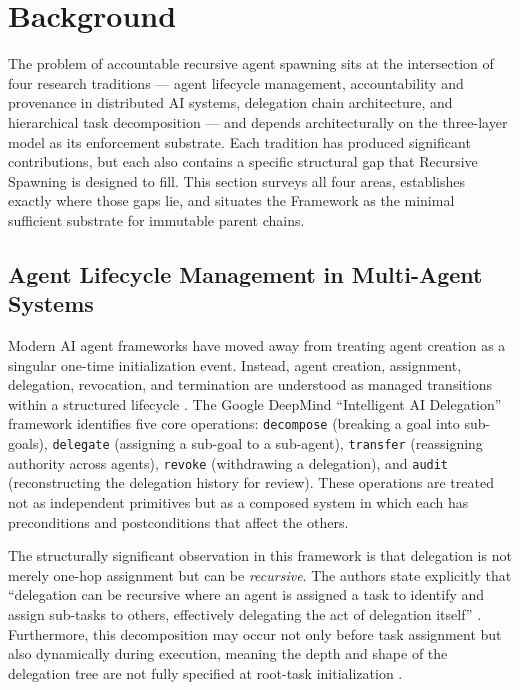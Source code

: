 \section{Background}\label{sec:rs-background}

The problem of accountable recursive agent spawning sits at the intersection of four research traditions --- agent lifecycle management, accountability and provenance in distributed AI systems, delegation chain architecture, and hierarchical task decomposition --- and depends architecturally on the \bxthree{} three-layer model as its enforcement substrate.  Each tradition has produced significant contributions, but each also contains a specific structural gap that Recursive Spawning is designed to fill.  This section surveys all four areas, establishes exactly where those gaps lie, and situates the \bxthree{} Framework as the minimal sufficient substrate for immutable parent chains.

\subsection{Agent Lifecycle Management in Multi-Agent Systems}\label{sec:lifecycle}

Modern AI agent frameworks have moved away from treating agent creation as a singular one-time initialization event.  Instead, agent creation, assignment, delegation, revocation, and termination are understood as managed transitions within a structured lifecycle \cite{intelligent_ai_delegation}.  The Google DeepMind ``Intelligent AI Delegation'' framework identifies five core operations: \texttt{decompose} (breaking a goal into sub-goals), \texttt{delegate} (assigning a sub-goal to a sub-agent), \texttt{transfer} (reassigning authority across agents), \texttt{revoke} (withdrawing a delegation), and \texttt{audit} (reconstructing the delegation history for review).  These operations are treated not as independent primitives but as a composed system in which each has preconditions and postconditions that affect the others.

The structurally significant observation in this framework is that delegation is not merely one-hop assignment but can be \emph{recursive}.  The authors state explicitly that ``delegation can be recursive where an agent is assigned a task to identify and assign sub-tasks to others, effectively delegating the act of delegation itself'' \cite[intelligent_ai_delegation, \S4.2]{arxiv2602.11865}.  Furthermore, this decomposition may occur not only before task assignment but also dynamically during execution, meaning the depth and shape of the delegation tree are not fully specified at root-task initialization \cite[intelligent_ai_delegation, \S4.1]{arxiv2602.11865}.

